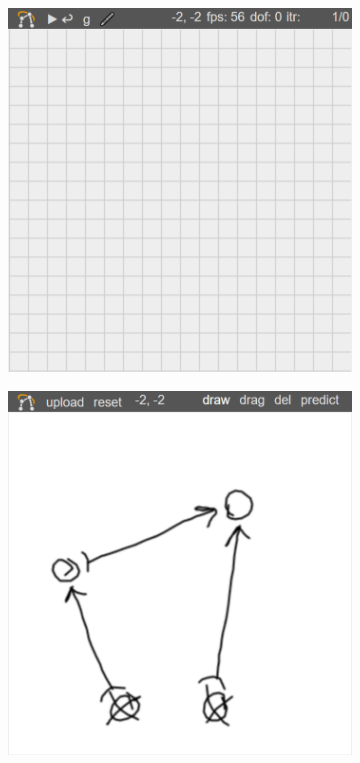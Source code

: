 \begin{figure}
    \centering
    \begin{subfigure}[b]{0.32\textwidth}
        \includegraphics[width=\textwidth]{images/prototype_before.png}
        \caption{}
        \label{fig:prototype_before}
    \end{subfigure}
    \begin{subfigure}[b]{0.32\textwidth}
        \includegraphics[width=\textwidth]{images/prototype_drawing_inverted.png}

\end{subfigure}
\end{figure}
